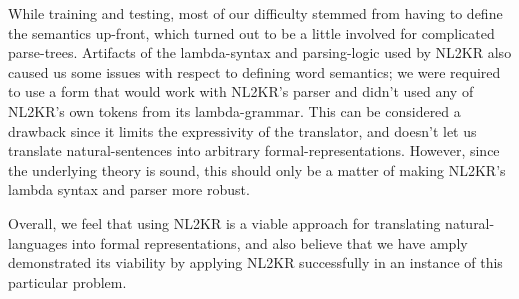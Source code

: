 \documentclass[11pt,letterpaper]{article}
\begin{document}
While training and testing, most of our difficulty stemmed from having to define the semantics up-front, which turned out to be a little involved for complicated parse-trees. Artifacts of the lambda-syntax and parsing-logic used by NL2KR also caused us some issues with respect to defining word semantics; we were required to use a form that would work with NL2KR's parser and didn't used any of NL2KR's own tokens from its lambda-grammar. This can be considered a drawback since it limits the expressivity of the translator, and doesn't let us translate natural-sentences into arbitrary formal-representations. However, since the underlying theory is sound, this should only be a matter of making NL2KR's lambda syntax and parser more robust.
\begin{table}[t]
\centering
{}
\caption{Performance of trained model across 5 test-sets}\label{table:results}
\end{table}
Overall, we feel that using NL2KR is a viable approach for translating natural-languages into formal representations, and also believe that we have amply demonstrated its viability by applying NL2KR successfully in an instance of this particular problem. 




\end{document}
